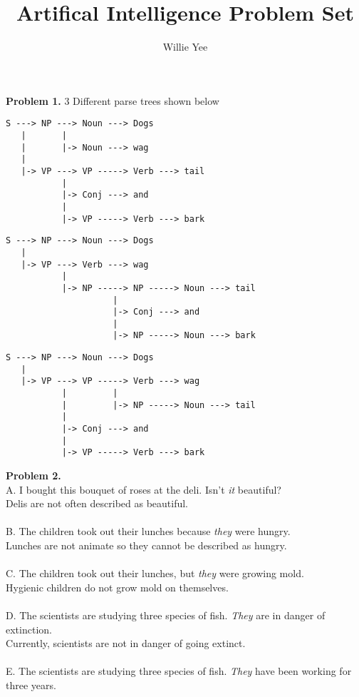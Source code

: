 \documentclass{article}
\begin{document}
\title{Artifical Intelligence Problem Set }
\date{}
\author{Willie Yee}
\maketitle
\noindent
\textbf{Problem 1.} 3 Different parse trees shown below
\begin{lstlisting}
S ---> NP ---> Noun ---> Dogs
   |       |
   |       |-> Noun ---> wag
   |
   |-> VP ---> VP -----> Verb ---> tail
           |
           |-> Conj ---> and
           |
           |-> VP -----> Verb ---> bark
\end{lstlisting}
\begin{lstlisting}
S ---> NP ---> Noun ---> Dogs
   |
   |-> VP ---> Verb ---> wag
           |
           |-> NP -----> NP -----> Noun ---> tail
                     |
                     |-> Conj ---> and
                     |
                     |-> NP -----> Noun ---> bark
\end{lstlisting}
\begin{lstlisting}
S ---> NP ---> Noun ---> Dogs
   |
   |-> VP ---> VP -----> Verb ---> wag
           |         |
           |         |-> NP -----> Noun ---> tail
           |
           |-> Conj ---> and
           |
           |-> VP -----> Verb ---> bark
\end{lstlisting}
\textbf{Problem 2.}\\
A. I bought this bouquet of roses at the deli. Isn't \textit{it} beautiful?\\
Delis are not often described as beautiful.\\
\\
B. The children took out their lunches because \textit{they} were hungry.\\
Lunches are not animate so they cannot be described as hungry.\\
\\
C. The children took out their lunches, but \textit{they} were growing mold.\\
Hygienic children do not grow mold on themselves.\\
\\
D. The scientists are studying three species of fish. \textit{They} are in danger of extinction.\\
Currently, scientists are not in danger of going extinct.\\
\\
E. The scientists are studying three species of fish. \textit{They} have been working for three years.\\
\end{document}
